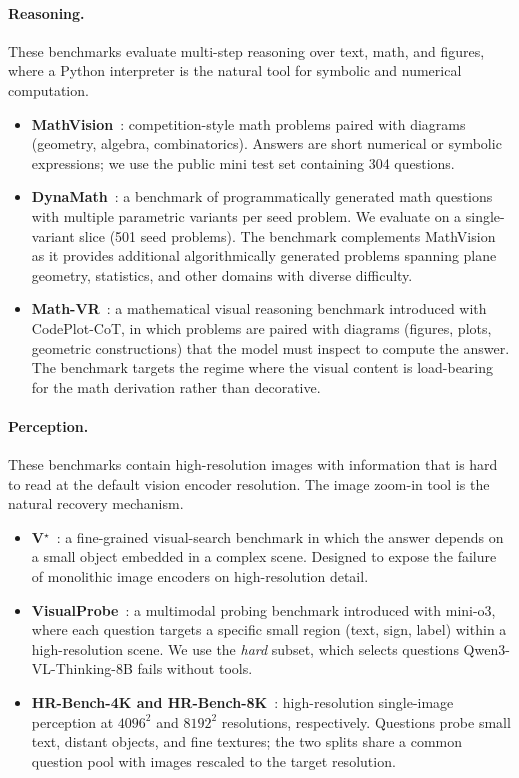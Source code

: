 \documentclass{llmxive}
\begin{document}
\paragraph{Reasoning.} These benchmarks evaluate multi-step reasoning over text, math, and figures, where a Python interpreter is the natural tool for symbolic and numerical computation.
\begin{itemize}[leftmargin=*, itemsep=2pt]
    \item \textbf{MathVision}~\citep{mathvision}: competition-style math problems paired with diagrams (geometry, algebra, combinatorics). Answers are short numerical or symbolic expressions; we use the public mini test set containing 304 questions.
    \item \textbf{DynaMath}~\citep{dynamath}: a benchmark of programmatically generated math questions with multiple parametric variants per seed problem. We evaluate on a single-variant slice (501 seed problems). The benchmark  complements MathVision as it provides additional algorithmically generated problems spanning plane geometry, statistics, and other domains with diverse difficulty.
    \item \textbf{Math-VR}~\citep{mathvr}: a mathematical visual reasoning benchmark introduced with CodePlot-CoT, in which problems are paired with diagrams (figures, plots, geometric constructions) that the model must inspect to compute the answer. The benchmark targets the regime where the visual content is load-bearing for the math derivation rather than decorative.
\end{itemize}

\paragraph{Perception.} These benchmarks contain high-resolution images with information that is hard to read at the default vision encoder resolution. The image zoom-in tool is the natural recovery mechanism.
\begin{itemize}[leftmargin=*, itemsep=2pt]
    \item \textbf{V$^{\star}$}~\citep{vstar}: a fine-grained visual-search benchmark in which the answer depends on a small object embedded in a complex scene. Designed to expose the failure of monolithic image encoders on high-resolution detail.
    \item \textbf{VisualProbe}~\citep{mini-o3}: a multimodal probing benchmark introduced with mini-o3, where each question targets a specific small region (text, sign, label) within a high-resolution scene. We use the \emph{hard} subset, which selects questions Qwen3-VL-Thinking-8B fails without tools.
    \item \textbf{HR-Bench-4K and HR-Bench-8K}~\citep{HRBench}: high-resolution single-image perception at $4096^2$ and $8192^2$ resolutions, respectively. Questions probe small text, distant objects, and fine textures; the two splits share a common question pool with images rescaled to the target resolution.
\end{itemize}
\end{document}
